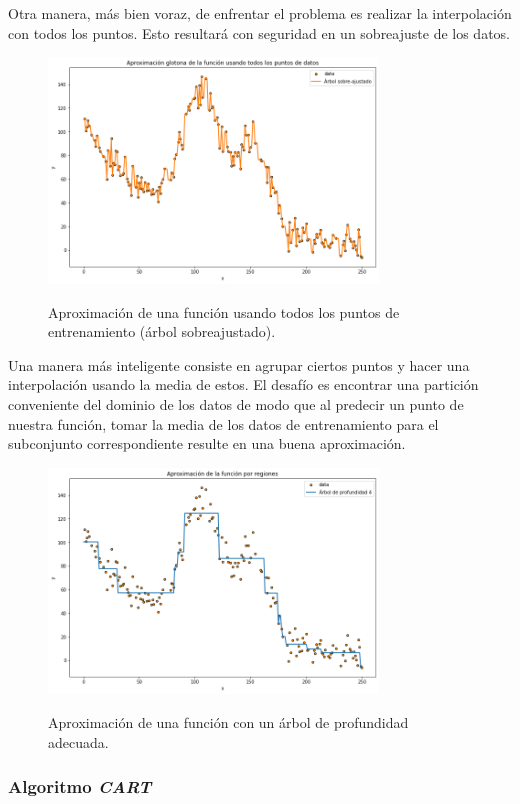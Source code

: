 Otra manera, más bien voraz, de enfrentar el problema es realizar la interpolación con todos los puntos. Esto resultará con seguridad en un sobreajuste de los datos.

\begin{figure}[h]
	\centering
	\includegraphics[height=6cm]{img/capN_sobreajuste_arbol.png}\\
	\caption{Aproximación de una función usando todos los puntos de entrenamiento (árbol sobreajustado).}
\end{figure}

Una manera más inteligente consiste en agrupar ciertos puntos y hacer una interpolación usando la media de estos. El desafío es encontrar una partición conveniente del dominio de los datos de modo que al predecir un punto de nuestra función, tomar la media de los datos de entrenamiento para el subconjunto correspondiente resulte en una buena aproximación.

\begin{figure}[h]
	\centering
	\includegraphics[height=6cm]{img/capN_buen_arbol.png}\\
	\caption{Aproximación de una función con un árbol de profundidad adecuada.}
\end{figure}


\subsubsection{Algoritmo \textit{CART}}

